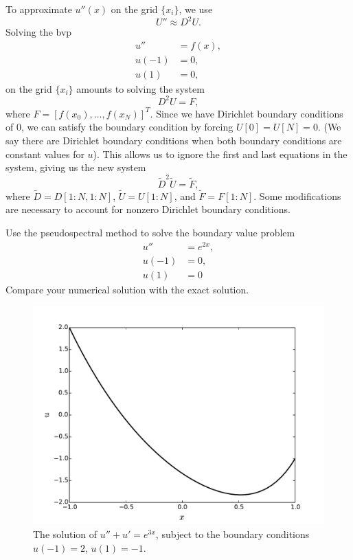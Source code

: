 To approximate $u''(x)$ on the grid $\{x_i\}$, we use 
\[U'' \approx D^2 U.\]
Solving the bvp
\begin{align*}
u'' &= f(x), \\
u(-1) &= 0, \\
u(1) &= 0,
\end{align*}
on the grid $\{x_i\}$ amounts to solving the system 
\[D^2 U = F,\]
where $F = [f(x_0),\ldots, f(x_N)]^T$.
Since we have Dirichlet boundary conditions of $0$, we can satisfy the boundary condition by forcing $U[0] = U[N] = 0$.
(We say there are Dirichlet boundary conditions when both boundary conditions are constant values for $u$).
This allows us to ignore the first and last equations in the system, giving us the new system 
\[\tilde{D}^2 \tilde{U} = \tilde{F},\]
where $\tilde{D} = D[1:N,1:N]$, $\tilde{U} = U[1:N]$, and $\tilde{F} = F[1:N]$.
Some modifications are necessary to account for nonzero Dirichlet boundary conditions.

\begin{problem}
Use the pseudospectral method to solve the boundary value problem 
\begin{align*}
u'' &= e^{2x}, \\
u(-1) &= 0, \\
u(1) &= 0
\end{align*}
Compare your numerical solution with the exact solution.
\end{problem}

\begin{figure}[ht]
\centering
\includegraphics[width=12cm]{nonzeroDirichlet.pdf}
\caption{The solution of $u'' + u' = e^{3x}$, subject to the boundary conditions 
$u(-1) = 2$, $u(1) = -1$.}
\label{fig:Spectral1_nonzeroDirichlet}
\end{figure}


